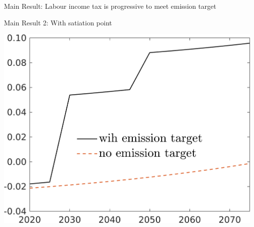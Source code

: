 \documentclass[11pt,aspectratio=169]{beamer}
\begin{document}
\begin{frame}{Main Result: Labour income tax is progressive to meet emission target}
\begin{minipage}[]{0.32\textwidth}
	\end{minipage}

\end{frame}

\begin{frame}{Main Result 2:  With satiation point}
			\centering
\begin{minipage}[]{0.32\textwidth}
	\includegraphics[width=1\textwidth]{../codding_model/own_basedOnFried/optimalPol_elastS_DisuSci/figures/all_1705/taul_TargetCompOPT_T_NoTaus_spillover0_sep1_BN1_ineq0_red0_etaa0.79_lgd1.png}
\end{minipage}
\begin{minipage}[]{0.32\textwidth}

\end{minipage}
\end{frame}
\end{document}
